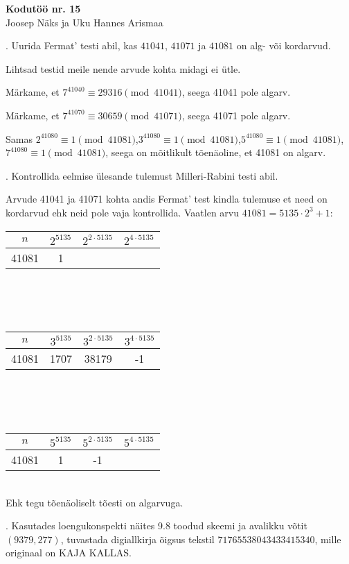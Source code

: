 \documentclass[a4paper, 10pt]{article}
\begin{document}
\begin{center}
\Large\textbf{Kodutöö nr. 15}\\
\small{Joosep Näks ja Uku Hannes Arismaa}
\end{center}


\bigskip

. Uurida Fermat' testi abil, kas $41041$, $41071$ ja $41081$ on alg- või kordarvud.

\bigskip
Lihtsad testid meile nende arvude kohta midagi ei ütle. 

Märkame, et $7^{41040}\equiv29316\pmod{41041}$, seega 41041 pole algarv.

Märkame, et $7^{41070}\equiv30659\pmod{41071}$, seega 41071 pole algarv.

Samas $2^{41080}\equiv1\pmod{41081}$,$3^{41080}\equiv1\pmod{41081}$,$5^{41080}\equiv1\pmod{41081}$,$7^{41080}\equiv1\pmod{41081}$, seega on mõitlikult tõenäoline, et 41081 on algarv.


\bigskip

. Kontrollida eelmise ülesande tulemust Milleri-Rabini testi abil. 

\bigskip
Arvude 41041 ja 41071 kohta andis Fermat' test kindla tulemuse et need on kordarvud ehk neid pole vaja kontrollida. Vaatlen arvu $41081=5135\cdot2^3+1$:\\
\begin{tabular}{c|c|c|c}
$n$&$2^{5135}$&$2^{2\cdot5135}$&$2^{4\cdot5135}$\\
\hline
41081&1
\end{tabular}\\\\\\
\begin{tabular}{c|c|c|c}
$n$&$3^{5135}$&$3^{2\cdot5135}$&$3^{4\cdot5135}$\\
\hline
41081&1707&38179&-1
\end{tabular}\\\\\\
\begin{tabular}{c|c|c|c}
$n$&$5^{5135}$&$5^{2\cdot5135}$&$5^{4\cdot5135}$\\
\hline
41081&1&-1
\end{tabular}\\
Ehk tegu tõenäoliselt tõesti on algarvuga.
\bigskip

. Kasutades loengukonspekti näites 9.8 toodud skeemi ja avalikku võtit $(9379,277)$, tuvastada digiallkirja õigsus tekstil $7176 5538 0434 3341 5340$, mille originaal on KAJA KALLAS. 
\end{document}
